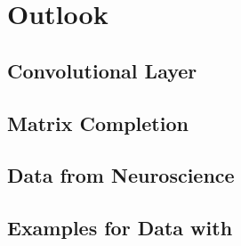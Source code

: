 \newpage
\section{Outlook}
\subsection{Convolutional Layer}
\subsection{Matrix Completion}
\subsection{Data from Neuroscience}
\subsection{Examples for Data with }
